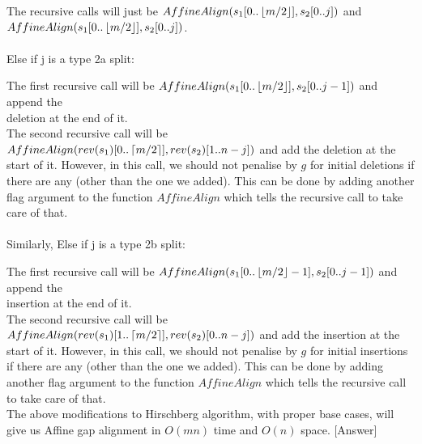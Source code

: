\documentclass[a4paper,11pt]{article}
\begin{document}
 The recursive calls will just be $AffineAlign(s_1[0..\left\lfloor m/2 \right\rfloor],s_2[0..j])$ and \\ $AffineAlign(s_1[0..\left\lfloor m/2 \right\rfloor],s_2[0..j])$.
\\
\\
 Else if j is a type 2a split:
 
 The first recursive call will be $AffineAlign(s_1[0..\left\lfloor m/2 \right\rfloor],s_2[0..j-1])$ and append the\\ deletion at the end of it. \\
 The second recursive call will be  $AffineAlign(rev(s_1)[0..\left\lceil m/2 \right\rceil],rev(s_2)[1..n-j])$ and add the deletion at the start of it. However, in this call, we should not penalise by $g$ for initial deletions if there are any (other than the one we added). This can be done by adding another flag argument to the function $AffineAlign$ which tells the recursive call to take care of that.
\\
\\
 Similarly,   Else if j is a type 2b split:
 
 The first recursive call will be $AffineAlign(s_1[0..\left\lfloor m/2 \right\rfloor-1],s_2[0..j-1])$ and append the\\ insertion at the end of it. \\
 The second recursive call will be  $AffineAlign(rev(s_1)[1..\left\lceil m/2 \right\rceil], rev(s_2)[0..n-j])$ and add the insertion at the start of it. However, in this call, we should not penalise by $g$ for initial insertions if there are any (other than the one we added). This can be done by adding another flag argument to the function $AffineAlign$ which tells the recursive call to take care of that.
 \\
 
The above modifications to Hirschberg algorithm, with proper base cases, will give us Affine gap alignment in $O(mn)$ time and $O(n)$ space. [Answer]
\end{document}
